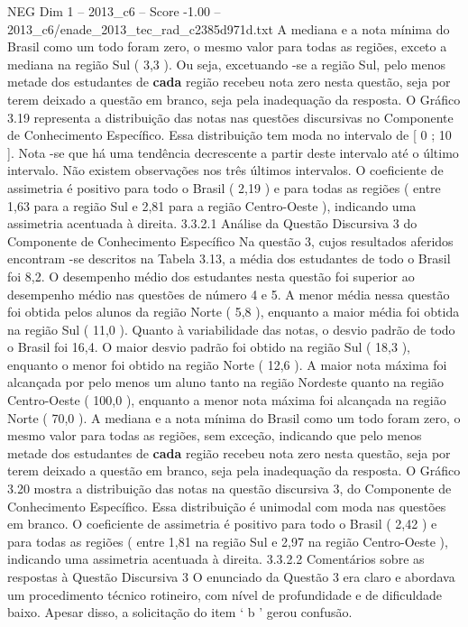 \begin{textsample}{NEG Dim 1 – 2013\_c6 – Score -1.00 – 2013\_c6/enade\_2013\_tec\_rad\_c2385d971d.txt}
A mediana e a nota mínima do Brasil como um todo foram zero, o mesmo valor para todas as regiões, exceto a mediana na região Sul ( 3,3 ).
Ou seja, excetuando -se a região Sul, pelo menos metade dos estudantes de \textbf{cada} região recebeu nota zero nesta questão, seja por terem deixado a questão em branco, seja pela inadequação da resposta.
O Gráfico 3.19 representa a distribuição das notas nas questões discursivas no Componente de Conhecimento Específico.
Essa distribuição tem moda no intervalo de [ 0 ; 10 ].
Nota -se que há uma tendência decrescente a partir deste intervalo até o último intervalo.
Não existem observações nos três últimos intervalos.
O coeficiente de assimetria é positivo para todo o Brasil ( 2,19 ) e para todas as regiões ( entre 1,63 para a região Sul e 2,81 para a região Centro-Oeste ), indicando uma assimetria acentuada à direita. 3.3.2.1 Análise da Questão Discursiva 3 do Componente de Conhecimento Específico Na questão 3, cujos resultados aferidos encontram -se descritos na Tabela 3.13, a média dos estudantes de todo o Brasil foi 8,2.
O desempenho médio dos estudantes nesta questão foi superior ao desempenho médio nas questões de número 4 e 5.
A menor média nessa questão foi obtida pelos alunos da região Norte ( 5,8 ), enquanto a maior média foi obtida na região Sul ( 11,0 ).
Quanto à variabilidade das notas, o desvio padrão de todo o Brasil foi 16,4.
O maior desvio padrão foi obtido na região Sul ( 18,3 ), enquanto o menor foi obtido na região Norte ( 12,6 ).
A maior nota máxima foi alcançada por pelo menos um aluno tanto na região Nordeste quanto na região Centro-Oeste ( 100,0 ), enquanto a menor nota máxima foi alcançada na região Norte ( 70,0 ).
A mediana e a nota mínima do Brasil como um todo foram zero, o mesmo valor para todas as regiões, sem exceção, indicando que pelo menos metade dos estudantes de \textbf{cada} região recebeu nota zero nesta questão, seja por terem deixado a questão em branco, seja pela inadequação da resposta.
O Gráfico 3.20 mostra a distribuição das notas na questão discursiva 3, do Componente de Conhecimento Específico.
Essa distribuição é unimodal com moda nas questões em branco.
O coeficiente de assimetria é positivo para todo o Brasil ( 2,42 ) e para todas as regiões ( entre 1,81 na região Sul e 2,97 na região Centro-Oeste ), indicando uma assimetria acentuada à direita. 3.3.2.2 Comentários sobre as respostas à Questão Discursiva 3 O enunciado da Questão 3 era claro e abordava um procedimento técnico rotineiro, com nível de profundidade e de dificuldade baixo.
Apesar disso, a solicitação do item ‘ b ’ gerou confusão.

\end{textsample}
